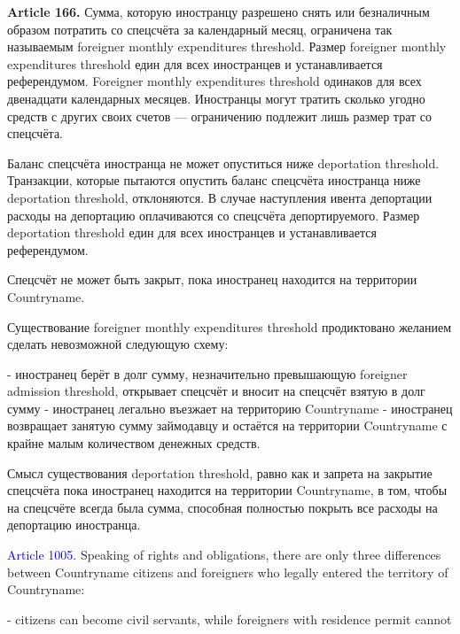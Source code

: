 \documentclass[11pt]{article}
\theoremstyle{remark}
\theoremstyle{definition}
\begin{document}
\color{black}


\textbf{Article 166.} Сумма, которую иностранцу разрешено снять или безналичным образом потратить со спецсчёта за календарный месяц, ограничена так называемым foreigner monthly expenditures threshold. Размер foreigner monthly expenditures threshold един для всех иностранцев и устанавливается референдумом. Foreigner monthly expenditures threshold одинаков для всех двенадцати календарных месяцев. Иностранцы могут тратить сколько угодно средств с других своих счетов --- ограничению подлежит лишь размер трат со спецсчёта. 

Баланс спецсчёта иностранца не может опуститься ниже deportation threshold. Транзакции, которые пытаются опустить баланс спецсчёта иностранца ниже deportation threshold, отклоняются. В случае наступления ивента депортации расходы на депортацию оплачиваются со спецсчёта депортируемого. Размер deportation threshold един для всех иностранцев и устанавливается референдумом.

Спецсчёт не может быть закрыт, пока иностранец находится на территории Countryname.


\color{blue}

Существование foreigner monthly expenditures threshold продиктовано желанием сделать невозможной следующую схему:

- иностранец берёт в долг сумму, незначительно превышающую foreigner admission threshold, открывает спецсчёт и вносит на спецсчёт взятую в долг сумму
- иностранец легально въезжает на территорию Countryname
- иностранец возвращает занятую сумму займодавцу и остаётся на территории Countryname с крайне малым количеством денежных средств.


Смысл существования deportation threshold, равно как и запрета на закрытие спецсчёта пока иностранец находится на территории Countryname, в том, чтобы на спецсчёте всегда была сумма, способная полностью покрыть все расходы на депортацию иностранца.


\color{black}












\textcolor{blue}{Article 1005.} Speaking of rights and obligations, there are only three differences between Countryname citizens and foreigners who legally entered the territory of Countryname:


- citizens can become civil servants, while foreigners with residence permit cannot
\end{document}
